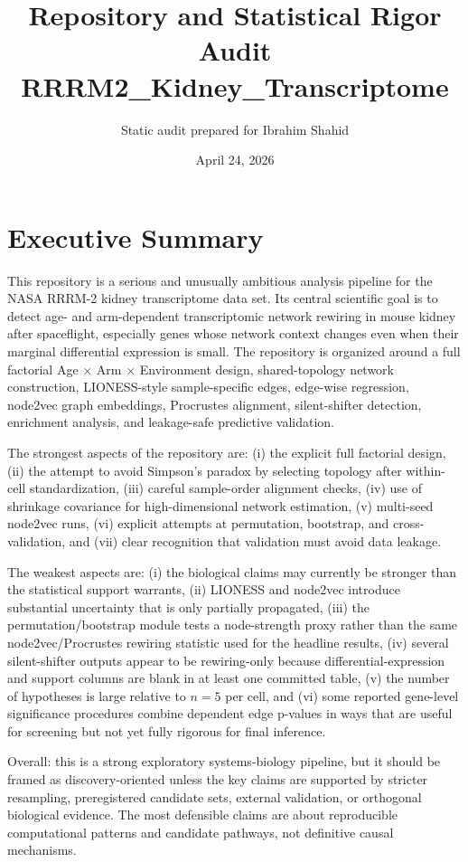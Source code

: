 \documentclass[11pt]{article}
\title{Repository and Statistical Rigor Audit\\\large RRRM2\_Kidney\_Transcriptome}
\author{Static audit prepared for Ibrahim Shahid}
\date{April 24, 2026}
\begin{document}
\maketitle

\section*{Executive Summary}

This repository is a serious and unusually ambitious analysis pipeline for the NASA RRRM-2 kidney transcriptome data set.  Its central scientific goal is to detect age- and arm-dependent transcriptomic network rewiring in mouse kidney after spaceflight, especially genes whose network context changes even when their marginal differential expression is small.  The repository is organized around a full factorial Age $\times$ Arm $\times$ Environment design, shared-topology network construction, LIONESS-style sample-specific edges, edge-wise regression, node2vec graph embeddings, Procrustes alignment, silent-shifter detection, enrichment analysis, and leakage-safe predictive validation.

The strongest aspects of the repository are: (i) the explicit full factorial design, (ii) the attempt to avoid Simpson's paradox by selecting topology after within-cell standardization, (iii) careful sample-order alignment checks, (iv) use of shrinkage covariance for high-dimensional network estimation, (v) multi-seed node2vec runs, (vi) explicit attempts at permutation, bootstrap, and cross-validation, and (vii) clear recognition that validation must avoid data leakage.

The weakest aspects are: (i) the biological claims may currently be stronger than the statistical support warrants, (ii) LIONESS and node2vec introduce substantial uncertainty that is only partially propagated, (iii) the permutation/bootstrap module tests a node-strength proxy rather than the same node2vec/Procrustes rewiring statistic used for the headline results, (iv) several silent-shifter outputs appear to be rewiring-only because differential-expression and support columns are blank in at least one committed table, (v) the number of hypotheses is large relative to $n=5$ per cell, and (vi) some reported gene-level significance procedures combine dependent edge p-values in ways that are useful for screening but not yet fully rigorous for final inference.

Overall: this is a strong exploratory systems-biology pipeline, but it should be framed as discovery-oriented unless the key claims are supported by stricter resampling, preregistered candidate sets, external validation, or orthogonal biological evidence.  The most defensible claims are about reproducible computational patterns and candidate pathways, not definitive causal mechanisms.
\end{document}
